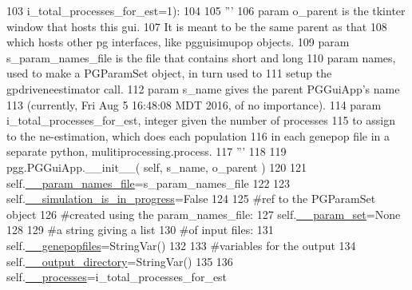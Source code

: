\begin{DoxyCode}
103                         i\_total\_processes\_for\_est=1):
104 
105         \textcolor{stringliteral}{'''}
106 \textcolor{stringliteral}{        param o\_parent is the tkinter window that hosts this gui.  }
107 \textcolor{stringliteral}{            It is meant to be the same parent as that }
108 \textcolor{stringliteral}{            which hosts other pg interfaces, like pgguisimupop objects.}
109 \textcolor{stringliteral}{        param s\_param\_names\_file is the file that contains short and long }
110 \textcolor{stringliteral}{            param names, used to make a PGParamSet object, in turn used to }
111 \textcolor{stringliteral}{            setup the gpdriveneestimator call.}
112 \textcolor{stringliteral}{        param s\_name gives the parent PGGuiApp's name }
113 \textcolor{stringliteral}{            (currently, Fri Aug  5 16:48:08 MDT 2016, of no importance).}
114 \textcolor{stringliteral}{        param i\_total\_processes\_for\_est, integer given the number of processes }
115 \textcolor{stringliteral}{            to assign to the ne-estimation, which does each population }
116 \textcolor{stringliteral}{            in each genepop file in a separate python, mulitiprocessing.process.}
117 \textcolor{stringliteral}{        '''}
118                 
119         pgg.PGGuiApp.\_\_init\_\_( self, s\_name, o\_parent )
120 
121         self.\hyperlink{classnegui_1_1temp_1_1PGGuiNeEstimator_afc32124917602f1ffc13629511b1f11c}{\_\_param\_names\_file}=s\_param\_names\_file
122 
123         self.\hyperlink{classnegui_1_1temp_1_1PGGuiNeEstimator_a3c5a2db4effdc9f3b4062e649b80752d}{\_\_simulation\_is\_in\_progress}=\textcolor{keyword}{False}
124 
125         \textcolor{comment}{#ref to the PGParamSet object}
126         \textcolor{comment}{#created using the param\_names\_file:}
127         self.\hyperlink{classnegui_1_1temp_1_1PGGuiNeEstimator_a4c3dd5a042c0b4c04547de18987f5202}{\_\_param\_set}=\textcolor{keywordtype}{None}
128         
129         \textcolor{comment}{#a string giving a list }
130         \textcolor{comment}{#of input files:}
131         self.\hyperlink{classnegui_1_1temp_1_1PGGuiNeEstimator_a2e1ada7f9c555d19c741f602a8f541ab}{\_\_genepopfiles}=StringVar()
132 
133         \textcolor{comment}{#variables for the output}
134         self.\hyperlink{classnegui_1_1temp_1_1PGGuiNeEstimator_a6089517cf331816716a65f83fbaafab2}{\_\_output\_directory}=StringVar()
135 
136         self.\hyperlink{classnegui_1_1temp_1_1PGGuiNeEstimator_a9bdde8c3fe94514d1266ef4c7882727c}{\_\_processes}=i\_total\_processes\_for\_est

\end{DoxyCode}
